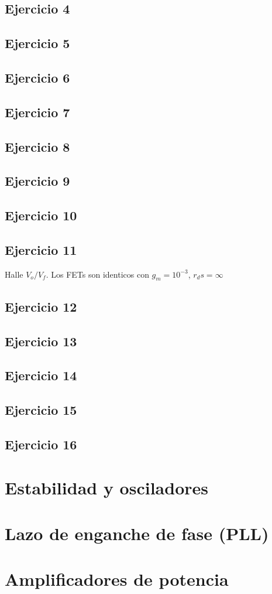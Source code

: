 \documentclass[landscape,onecolumn,letter]{book}
\begin{document}
		\section{Ejercicio 4}
		\section{Ejercicio 5}
		\section{Ejercicio 6}
		\section{Ejercicio 7}
		\section{Ejercicio 8}
		\section{Ejercicio 9}
		\section{Ejercicio 10}
		\section{Ejercicio 11}
		Halle $V_o / V_f$. Los FETs son identicos con $g_m = 10^{-3}$, $r_d s = \infty$
		\section{Ejercicio 12}
		\section{Ejercicio 13}
		\section{Ejercicio 14}
		\section{Ejercicio 15}		
		\section{Ejercicio 16}
			
	\chapter{Estabilidad y osciladores} %
	
	\chapter{Lazo de enganche de fase (PLL)} %
	
	\chapter{Amplificadores de potencia} %

	
\end{document}
